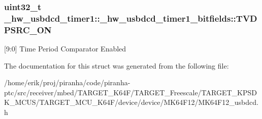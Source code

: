\subsubsection[{\texorpdfstring{T\+V\+D\+P\+S\+R\+C\+\_\+\+ON}{TVDPSRC_ON}}]{\setlength{\rightskip}{0pt plus 5cm}uint32\+\_\+t \+\_\+hw\+\_\+usbdcd\+\_\+timer1\+::\+\_\+hw\+\_\+usbdcd\+\_\+timer1\+\_\+bitfields\+::\+T\+V\+D\+P\+S\+R\+C\+\_\+\+ON}\hypertarget{struct__hw__usbdcd__timer1_1_1__hw__usbdcd__timer1__bitfields_a140d1c6462e95b8503387c05ccbcfe0f}{}\label{struct__hw__usbdcd__timer1_1_1__hw__usbdcd__timer1__bitfields_a140d1c6462e95b8503387c05ccbcfe0f}
\mbox{[}9\+:0\mbox{]} Time Period Comparator Enabled 

The documentation for this struct was generated from the following file\+:\begin{DoxyCompactItemize}
\item 
/home/erik/proj/piranha/code/piranha-\/ptc/src/receiver/mbed/\+T\+A\+R\+G\+E\+T\+\_\+\+K64\+F/\+T\+A\+R\+G\+E\+T\+\_\+\+Freescale/\+T\+A\+R\+G\+E\+T\+\_\+\+K\+P\+S\+D\+K\+\_\+\+M\+C\+U\+S/\+T\+A\+R\+G\+E\+T\+\_\+\+M\+C\+U\+\_\+\+K64\+F/device/device/\+M\+K64\+F12/M\+K64\+F12\+\_\+usbdcd.\+h\end{DoxyCompactItemize}
